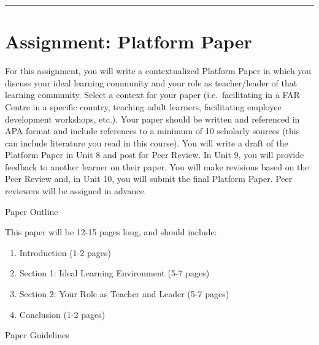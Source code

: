 \documentclass[
]{book}
\providecommand{\tightlist}{%
  \setlength{\itemsep}{0pt}\setlength{\parskip}{0pt}}
\begin{document}
\begin{center}\rule{0.5\linewidth}{0.5pt}\end{center}

\hypertarget{assignment-platform-paper}{%
\section*{Assignment: Platform Paper}\label{assignment-platform-paper}}

\begin{assessment}
For this assignment, you will write a contextualized Platform Paper in
which you discuss your ideal learning community and your role as
teacher/leader of that learning community. Select a context for your
paper (i.e.~facilitating in a FAR Centre in a specific country, teaching
adult learners, facilitating employee development workshops, etc.). Your
paper should be written and referenced in APA format and include
references to a minimum of 10 scholarly sources (this can include
literature you read in this course). You will write a draft of the
Platform Paper in Unit 8 and post for Peer Review. In Unit 9, you will
provide feedback to another learner on their paper. You will make
revisions based on the Peer Review and, in Unit 10, you will submit the
final Platform Paper. Peer reviewers will be assigned in advance.

{Paper Outline}

This paper will be 12-15 pages long, and should include:

\begin{enumerate}
\def\labelenumi{\arabic{enumi}.}
\tightlist
\item
  Introduction (1-2 pages)\\
\item
  Section 1: Ideal Learning Environment (5-7 pages)\\
\item
  Section 2: Your Role as Teacher and Leader (5-7 pages)\\
\item
  Conclusion (1-2 pages)
\end{enumerate}

{Paper Guidelines}


\end{assessment}
\end{document}
